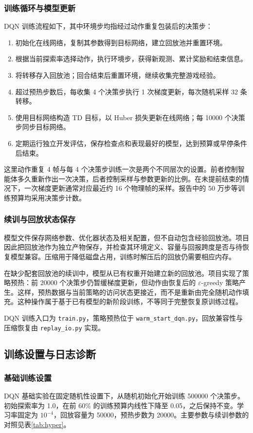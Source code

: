 \subsubsection{训练循环与模型更新}
DQN 训练流程如下，其中环境步均指经过动作重复包装后的决策步：
\begin{enumerate}
 \item 初始化在线网络，复制其参数得到目标网络，建立回放池并重置环境。
 \item 根据当前探索率选择动作，执行环境步，获得新观测、累计奖励和结束信息。
 \item 将转移存入回放池；回合结束后重置环境，继续收集完整游戏经验。
 \item 超过预热步数后，每收集 4 个决策步执行 1 次梯度更新，每次随机采样 32 条转移。
 \item 使用目标网络构造 TD 目标，以 Huber 损失更新在线网络；每 10000 个决策步同步目标网络。
 \item 定期运行独立开发评估，保存检查点和表现最好的模型，达到预算或早停条件后结束。
\end{enumerate}

这里动作重复 4 帧与每 4 个决策步训练一次是两个不同层次的设置。前者控制智能体多久重新作出一次决策，后者控制采样与参数更新的比例。在未提前结束的情况下，一次梯度更新通常对应最近约 16 个物理帧的采样。报告中的 50 万步等训练预算均采用决策步计数。

\subsubsection{续训与回放状态保存}
模型文件保存网络参数、优化器状态及相关配置，但不自动包含经验回放池。项目因此把回放池作为独立产物保存，并检查其环境定义、容量与回报跨度是否与待恢复模型兼容。压缩用于降低磁盘占用，训练时解压后的回放仍需要相应内存。

在缺少配套回放池的续训中，模型从已有权重开始建立新的回放池。项目实现了策略预热：前 20000 个决策步仍暂缓梯度更新，但动作由恢复后的 $\varepsilon$-greedy 策略产生。这样，预热数据与当前策略的访问状态更接近，而不是重新由完全随机动作填充。这种操作属于基于已有模型的新阶段训练，不等同于完整恢复原训练过程。

DQN 训练入口为 \texttt{train.py}，策略预热位于 \texttt{warm\_start\_dqn.py}，回放兼容性与压缩恢复由 \texttt{replay\_io.py} 实现。

\subsection{训练设置与日志诊断}
\subsubsection{基础训练设置}
DQN 基础实验在固定随机性设置下，从随机初始化开始训练 500000 个决策步。初始探索率为 1.0，在前 60\% 的训练预算内线性下降至 0.05，之后保持不变。学习率固定为 $10^{-4}$，回放容量为 50000，预热步数为 20000。主要参数与续训参数的对照见表\ref{tab:hyper}。

